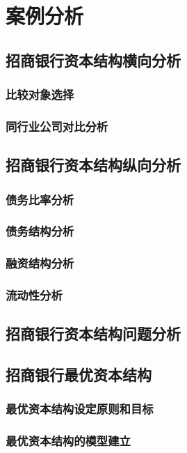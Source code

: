 \chapter{案例分析}

\section{招商银行资本结构横向分析}
\subsection{比较对象选择}
\subsection{同行业公司对比分析}

\section{招商银行资本结构纵向分析}
\subsection{债务比率分析}
\subsection{债务结构分析}
\subsection{融资结构分析}
\subsection{流动性分析}

\section{招商银行资本结构问题分析}

\section{招商银行最优资本结构}
\subsection{最优资本结构设定原则和目标}
\subsection{最优资本结构的模型建立}
